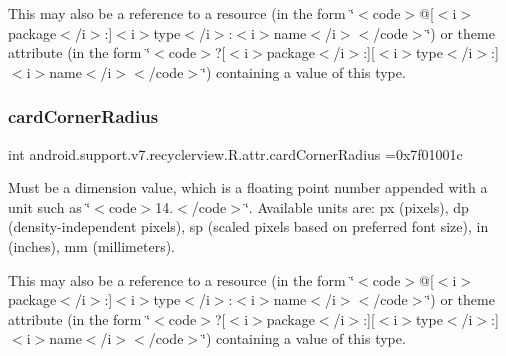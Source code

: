 This may also be a reference to a resource (in the form \char`\"{}$<$code$>$@\mbox{[}$<$i$>$package$<$/i$>$\+:\mbox{]}$<$i$>$type$<$/i$>$\+:$<$i$>$name$<$/i$>$$<$/code$>$\char`\"{}) or theme attribute (in the form \char`\"{}$<$code$>$?\mbox{[}$<$i$>$package$<$/i$>$\+:\mbox{]}\mbox{[}$<$i$>$type$<$/i$>$\+:\mbox{]}$<$i$>$name$<$/i$>$$<$/code$>$\char`\"{}) containing a value of this type. \mbox{\label{classandroid_1_1support_1_1v7_1_1recyclerview_1_1R_1_1attr_a3b1b87ba8de6ddac0572640243b7f349}} 
\subsubsection{\texorpdfstring{card\+Corner\+Radius}{cardCornerRadius}}
{\footnotesize\ttfamily int android.\+support.\+v7.\+recyclerview.\+R.\+attr.\+card\+Corner\+Radius =0x7f01001c\hspace{0.3cm}{\ttfamily [static]}}

Must be a dimension value, which is a floating point number appended with a unit such as \char`\"{}$<$code$>$14.\+5sp$<$/code$>$\char`\"{}. Available units are\+: px (pixels), dp (density-\/independent pixels), sp (scaled pixels based on preferred font size), in (inches), mm (millimeters). 

This may also be a reference to a resource (in the form \char`\"{}$<$code$>$@\mbox{[}$<$i$>$package$<$/i$>$\+:\mbox{]}$<$i$>$type$<$/i$>$\+:$<$i$>$name$<$/i$>$$<$/code$>$\char`\"{}) or theme attribute (in the form \char`\"{}$<$code$>$?\mbox{[}$<$i$>$package$<$/i$>$\+:\mbox{]}\mbox{[}$<$i$>$type$<$/i$>$\+:\mbox{]}$<$i$>$name$<$/i$>$$<$/code$>$\char`\"{}) containing a value of this type. \mbox{\label{classandroid_1_1support_1_1v7_1_1recyclerview_1_1R_1_1attr_a2f4bd3834ca1ae015c41fec2bc0b4606}} 
